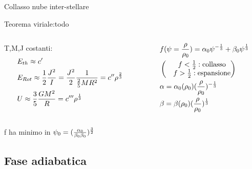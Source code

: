 \begin{wordonframe}{Collasso nube inter-stellare}\tolbf
\begin{block}{Teorema viriale:todo}\end{block}
\begin{columns}[T]
\begin{column}{0.5\textwidth}
T,M,J costanti:
\begin{align*}
&E_{th}\approx c'\\
&E_{Rot}\approx\frac{1}{2}\frac{J^2}{I}=\frac{J^2}{2}\frac{1}{\frac{2}{5}MR^2}=c''\rho^{\frac{2}{3}}\\
&U\approx\frac{3}{5}\frac{GM^2}{R}=c'''\rho^{\frac{1}{3}}
\end{align*}
\end{column}
\begin{column}{0.5\textwidth}
\begin{align*}
&f(\psi=\frac{\rho}{\rho_0})=\alpha_0\psi^{-\frac{1}{3}}+\beta_0\psi^{\frac{1}{3}}\\
&\begin{pmatrix}
&f<\frac{1}{2}: \text{collasso}\\
&f>\frac{1}{2}: \text{espansione}\\
\end{pmatrix}\\
&\alpha=\alpha_0(\rho_0)(\frac{\rho}{\rho_0})^{-\frac{1}{3}}\\
&\beta=\beta(\rho_0)(\frac{\rho}{\rho_0})^{\frac{1}{3}}
\end{align*}
\end{column}
\end{columns}
f ha minimo in $\psi_0=(\frac{\alpha_0}{\beta_0\beta_0})^{\frac{3}{2}}$
\end{wordonframe}

\subsection{Fase adiabatica}

